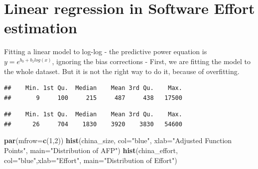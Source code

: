 \documentclass[]{book}
\newenvironment{Shaded}{\begin{snugshade}}{\end{snugshade}}
\newcommand{\KeywordTok}[1]{\textcolor[rgb]{0.13,0.29,0.53}{\textbf{{#1}}}}
\newcommand{\DataTypeTok}[1]{\textcolor[rgb]{0.13,0.29,0.53}{{#1}}}
\newcommand{\DecValTok}[1]{\textcolor[rgb]{0.00,0.00,0.81}{{#1}}}
\newcommand{\StringTok}[1]{\textcolor[rgb]{0.31,0.60,0.02}{{#1}}}
\newcommand{\NormalTok}[1]{{#1}}
\begin{document}
\section{Linear regression in Software Effort
estimation}\label{linear-regression-in-software-effort-estimation}

Fitting a linear model to log-log - the predictive power equation is
\(y= e^{b_0 + b_1 log(x)}\), ignoring the bias corrections - First, we
are fitting the model to the whole dataset. But it is not the right way
to do it, because of overfitting.

\begin{Shaded}
\end{Shaded}

\begin{verbatim}
##    Min. 1st Qu.  Median    Mean 3rd Qu.    Max. 
##       9     100     215     487     438   17500
\end{verbatim}

\begin{Shaded}
\end{Shaded}

\begin{verbatim}
##    Min. 1st Qu.  Median    Mean 3rd Qu.    Max. 
##      26     704    1830    3920    3830   54600
\end{verbatim}

\begin{Shaded}
\begin{Highlighting}[]
\KeywordTok{par}\NormalTok{(}\DataTypeTok{mfrow=}\KeywordTok{c}\NormalTok{(}\DecValTok{1}\NormalTok{,}\DecValTok{2}\NormalTok{))}
\KeywordTok{hist}\NormalTok{(china_size, }\DataTypeTok{col=}\StringTok{"blue"}\NormalTok{, }\DataTypeTok{xlab=}\StringTok{"Adjusted Function Points"}\NormalTok{, }\DataTypeTok{main=}\StringTok{"Distribution of AFP"}\NormalTok{)}
\KeywordTok{hist}\NormalTok{(china_effort, }\DataTypeTok{col=}\StringTok{"blue"}\NormalTok{,}\DataTypeTok{xlab=}\StringTok{"Effort"}\NormalTok{, }\DataTypeTok{main=}\StringTok{"Distribution of Effort"}\NormalTok{)}
\end{Highlighting}
\end{Shaded}
\end{document}

